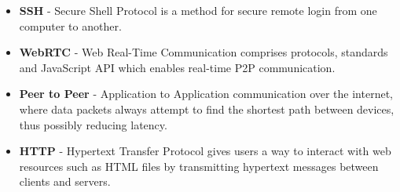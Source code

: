 \begin{itemize}
    \item \textbf{SSH} - Secure Shell Protocol is a method for secure remote login from one computer to another.
    \item \textbf{WebRTC} - Web Real-Time Communication comprises protocols, standards and 
    JavaScript API which enables real-time P2P communication.
    \item \textbf{Peer to Peer} - Application to Application communication over the internet, 
    where data packets always attempt to find the shortest path between devices, thus possibly reducing latency.
    \item \textbf{HTTP} - Hypertext Transfer Protocol gives users a way to interact with web resources such as HTML files by transmitting hypertext messages between clients and servers.
\end{itemize}
